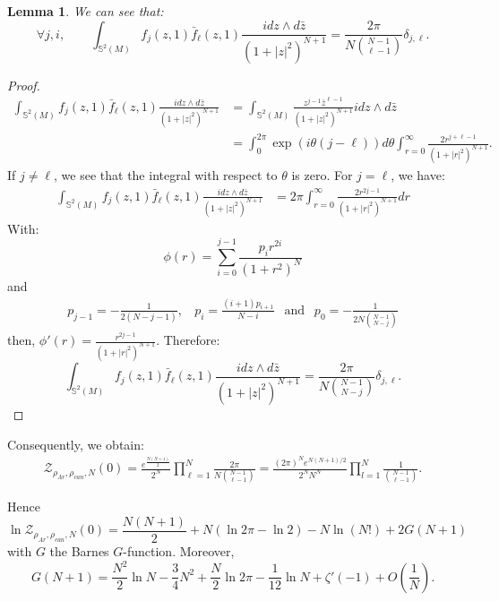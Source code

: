 \documentclass{article}
\newtheorem{Lemma}[theorem]{Lemma}
\theoremstyle{definition}
\theoremstyle{remark}
\begin{document}
\begin{Lemma}
    We can see that: 
    \begin{equation*}
       \forall j,i, \quad\quad \int_{\mathbb{S}^{2}(M)}f_{j}(z,1)\bar{f}_{\ell}(z,1)\frac{id z\wedge d\bar{z}}{(1+|z|^{2})^{N+1}} =\frac{2\pi}{N \binom{N-1}{\ell-1}}\delta_{j,\ell}.
    \end{equation*}
\end{Lemma}
\begin{proof}
    \begin{align*}
        \int_{\mathbb{S}^{2}(M)}f_{j}(z,1)\bar{f}_{\ell}(z,1)\frac{id z\wedge d\bar{z}}{(1+|z|^{2})^{N+1}}&=\int_{\mathbb{S}^{2}(M)}\frac{z^{j-1}\bar{z}^{\ell-1}}{(1+|z|^{2})^{N+1}}idz\wedge d \bar{z} \\&=\int_{0}^{2\pi} \exp(i\theta(j-\ell))d\theta\int_{r=0}^{\infty}\frac{2r^{j+\ell-1}}{(1+|r|^{2})^{N+1}}.
    \end{align*}
    If $j\neq \ell$, we see that the integral with respect to $\theta$ is zero. For $j=\ell$, we have: 
    \begin{align*}
        \int_{\mathbb{S}^{2}(M)}f_{j}(z,1)\bar{f}_{\ell}(z,1)\frac{id z\wedge d\bar{z}}{(1+|z|^{2})^{N+1}}&=2\pi \int_{r=0}^{\infty}\frac{2 r^{2j-1}}{(1+|r|^{2})^{N+1}}dr
    \end{align*}
    With: $$\phi(r)=\sum_{i=0}^{j-1}\frac{p_{i}r^{2i}}{(1+r^{2})^{N}}$$ and \begin{align*}
        p_{j-1}=-\frac{1}{2(N-j-1)},~~~~ p_{i}=\frac{(i+1)p_{i+1}}{N-i} ~~\text{ and }~~p_{0}=-\frac{1}{2 N \binom{N-1}{N-j}}
    \end{align*}
    then, $\phi'(r)=\frac{ r^{2j-1}}{(1+|r|^{2})^{N+1}}.$ Therefore: $$\int_{\mathbb{S}^{2}(M)}f_{j}(z,1)\bar{f}_{\ell}(z,1)\frac{id z\wedge d\bar{z}}{(1+|z|^{2})^{N+1}}=\frac{2\pi}{N\binom{N-1}{N-j}}\delta_{j,\ell}.$$
\end{proof}
Consequently, we obtain: \begin{align*}
    \mathcal{Z}_{\rho_{Ar},\rho_{can},N}(0)=\frac{e^{\frac{N(N+1)}{2}}}{2^{N}}\prod_{\ell=1}^{N}\frac{2\pi}{N\binom{N-1}{\ell-1}}=\frac{(2\pi)^{N} e^{N(N+1)/2}}{2^{N}N^{N}}\prod_{l=1}^{N}\frac{1}{\binom{N-1}{\ell-1}}.
\end{align*}

Hence $$\ln \mathcal{Z}_{\rho_{Ar},\rho_{can},N}(0)=\frac{N(N+1)}{2}+N\left(\ln2\pi-\ln2 \right)-N\ln(N!)+2G(N+1)$$ with $G$ the Barnes $G$-function. Moreover, \begin{equation}\label{Eq:Barnes}G(N+1)=\frac{N^{2}}{2}\ln N-\frac{3}{4}N^{2}+\frac{N}{2}\ln2\pi-\frac{1}{12}\ln N+\zeta'(-1)+O\left(\frac{1}{N} \right).\end{equation}
\end{document}

